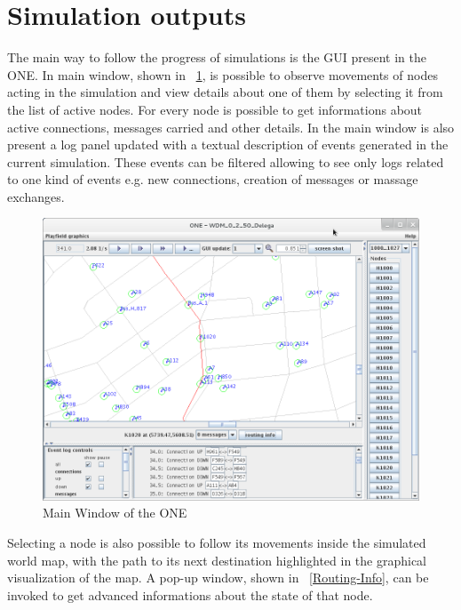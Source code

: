 \section{Simulation outputs}
The main way to follow the progress of simulations is the GUI present in the ONE. In main window, shown in \figurename~\ref{Schermata-ONE}, is possible to observe movements of nodes acting in the simulation and view details about one of them by selecting it from the list of active nodes. For every node is possible to get informations about active connections, messages carried and other details. In the main window is also present a log panel updated with a textual description of events generated in the current simulation. These events can be filtered allowing to see only logs related to one kind of events e.g. new connections, creation of messages or massage exchanges.
\\
\begin{figure}[htpb]
  \begin{center}
    \includegraphics[scale=0.4]{5-simulatore/img/Schermata-ONE.png}
    \caption[Main window]{Main Window of the ONE}    
    \label{Schermata-ONE}
  \end{center}
\end{figure}

Selecting a node is also possible to follow its movements inside the simulated world map, with the path to its next destination highlighted in the graphical visualization of the map. A pop-up window, shown in \figurename~\ref{Routing-Info}, can be invoked to get advanced informations about the state of that node.
\\

